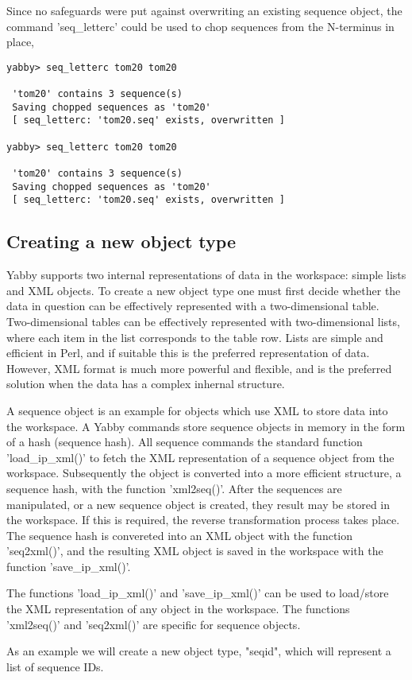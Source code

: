 Since no safeguards were put against overwriting an existing
sequence object, the command 'seq\_letterc' could be used to
chop sequences from the N-terminus in place,

\begin{verbatim}
yabby> seq_letterc tom20 tom20

 'tom20' contains 3 sequence(s)
 Saving chopped sequences as 'tom20'
 [ seq_letterc: 'tom20.seq' exists, overwritten ]

yabby> seq_letterc tom20 tom20

 'tom20' contains 3 sequence(s)
 Saving chopped sequences as 'tom20'
 [ seq_letterc: 'tom20.seq' exists, overwritten ]
\end{verbatim}

\subsection{Creating a new object type}

Yabby supports two internal representations of data in the workspace:
simple lists and XML objects. To create a new object type one must
first decide whether the data in question can be effectively
represented with a two-dimensional table. Two-dimensional tables
can be effectively represented with two-dimensional lists, where
each item in the list corresponds to the table row. Lists are simple
and efficient in Perl, and if suitable this is the preferred
representation of data. However, XML format is much more powerful
and flexible, and is the preferred solution when the data has
a complex inhernal structure.

A sequence object is an example for objects which use XML to store 
data into the workspace. A Yabby commands store sequence objects
in memory in the form of a hash (sequence hash).  All sequence
commands the standard function 'load\_ip\_xml()' to fetch the XML
representation of a sequence object from the workspace. Subsequently
the object is converted into a more efficient structure, a
sequence hash, with the function 'xml2seq()'. After the sequences
are manipulated, or a new sequence object is created, they result
may be stored in the workspace. If this is required, the reverse
transformation process takes place.  The sequence hash is convereted
into an XML object with the function 'seq2xml()', and the resulting
XML object is saved in the workspace with the function 'save\_ip\_xml()'.

The functions 'load\_ip\_xml()' and 'save\_ip\_xml()' can be used
to load/store the XML representation of any object in the workspace.
The functions 'xml2seq()' and 'seq2xml()' are specific for sequence
objects.

As an example we will create a new object type, "seqid", which will
represent a list of sequence IDs.



